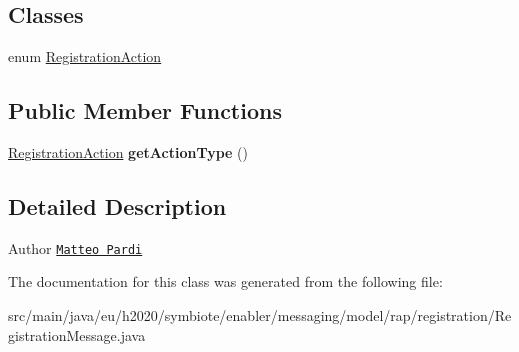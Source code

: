 \subsection*{Classes}
\begin{DoxyCompactItemize}
\item 
enum \hyperlink{enumeu_1_1h2020_1_1symbiote_1_1enabler_1_1messaging_1_1model_1_1rap_1_1registration_1_1Registrat1f4e4e7672b628dc11e563cd077b2d6a}{Registration\+Action}
\end{DoxyCompactItemize}
\subsection*{Public Member Functions}
\begin{DoxyCompactItemize}
\item 
\mbox{\label{classeu_1_1h2020_1_1symbiote_1_1enabler_1_1messaging_1_1model_1_1rap_1_1registration_1_1RegistrationMessage_ab2f18815a90f5683659ba1f9389b0955}} 
\hyperlink{enumeu_1_1h2020_1_1symbiote_1_1enabler_1_1messaging_1_1model_1_1rap_1_1registration_1_1Registrat1f4e4e7672b628dc11e563cd077b2d6a}{Registration\+Action} {\bfseries get\+Action\+Type} ()
\end{DoxyCompactItemize}


\subsection{Detailed Description}
\begin{DoxyAuthor}{Author}
\href{mailto:m.pardi@nextworks.it}{\tt Matteo Pardi} 
\end{DoxyAuthor}


The documentation for this class was generated from the following file\+:\begin{DoxyCompactItemize}
\item 
src/main/java/eu/h2020/symbiote/enabler/messaging/model/rap/registration/Registration\+Message.\+java\end{DoxyCompactItemize}
